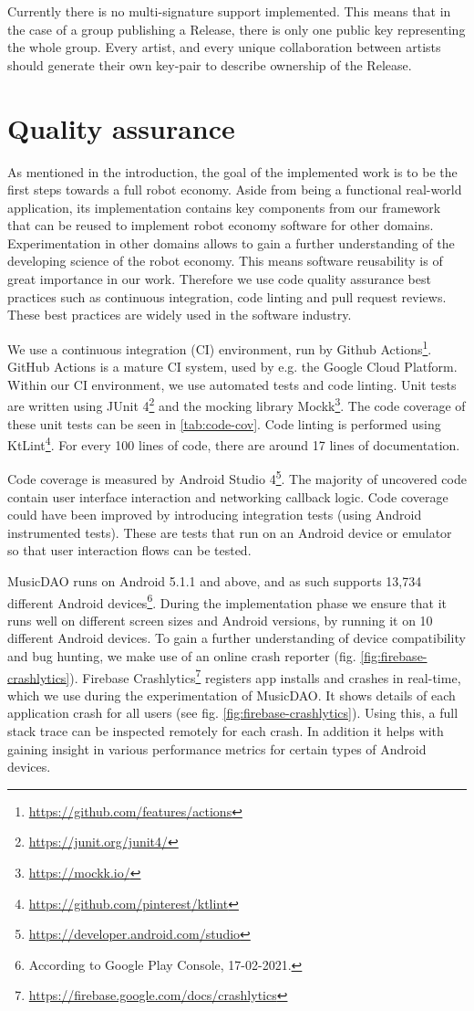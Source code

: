 Currently there is no multi-signature support implemented. This means that in the case of a group publishing a Release, there is only one public key representing the whole group. Every artist, and every unique collaboration between artists should generate their own key-pair to describe ownership of the Release.

\section{Quality assurance}
As mentioned in the introduction, the goal of the implemented work is to be the first steps towards a full robot economy. Aside from being a functional real-world application, its implementation contains key components from our framework that can be reused to implement robot economy software for other domains. Experimentation in other domains allows to gain a further understanding of the developing science of the robot economy. This means software reusability is of great importance in our work. Therefore we use code quality assurance best practices such as continuous integration, code linting and pull request reviews. These best practices are widely used in the software industry. 

We use a continuous integration (CI) environment, run by Github Actions\footnote{\url{https://github.com/features/actions}}. GitHub Actions is a mature CI system, used by e.g. the Google Cloud Platform. Within our CI environment, we use automated tests and code linting. Unit tests are written using JUnit 4\footnote{\url{https://junit.org/junit4/}} and the mocking library Mockk\footnote{\url{https://mockk.io/}}. The code coverage of these unit tests can be seen in \ref{tab:code-cov}. Code linting is performed using KtLint\footnote{\url{https://github.com/pinterest/ktlint}}. For every 100 lines of code, there are around 17 lines of documentation.

Code coverage is measured by Android Studio 4\footnote{\url{https://developer.android.com/studio}}. The majority of uncovered code contain user interface interaction and networking callback logic. Code coverage could have been improved by introducing integration tests (using Android instrumented tests). These are tests that run on an Android device or emulator so that user interaction flows can be tested. 

MusicDAO runs on Android 5.1.1 and above, and as such supports 13,734 different Android devices\footnote{According to Google Play Console, 17-02-2021.}. During the implementation phase we ensure that it runs well on different screen sizes and Android versions, by running it on 10 different Android devices. To gain a further understanding of device compatibility and bug hunting, we make use of an online crash reporter (fig. \ref{fig:firebase-crashlytics}). Firebase Crashlytics\footnote{\url{https://firebase.google.com/docs/crashlytics}} registers app installs and crashes in real-time, which we use during the experimentation of MusicDAO. It shows details of each application crash for all users (see fig. \ref{fig:firebase-crashlytics}). Using this, a full stack trace can be inspected remotely for each crash. In addition it helps with gaining insight in various performance metrics for certain types of Android devices.

